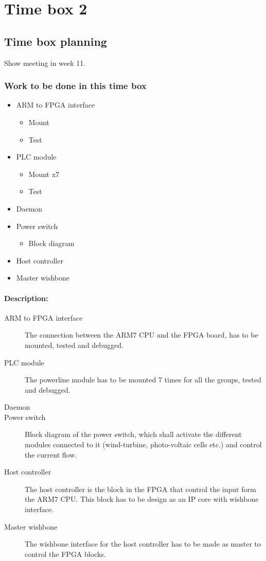 \section{Time box 2}
\subsection{Time box planning}
Show meeting in week 11.
\subsubsection{Work to be done in this time box}
\begin{itemize}
	\item ARM to FPGA interface
	\begin{itemize}
		\item Mount
		\item Test
	\end{itemize}
	\item PLC module
	\begin{itemize}
		\item Mount x7
		\item Test
	\end{itemize}
	\item Daemon
	\item Power switch
	\begin{itemize}
		\item Block diagram
	\end{itemize}
	\item Host controller
	\item Master wishbone
\end{itemize}
\paragraph{Description:}
\begin{description}
	\item[ARM to FPGA interface] The connection between the ARM7 CPU and the FPGA board, has to be mounted, tested and debugged.
	\item[PLC module] The powerline module has to be mounted 7 times for all the groups, tested and debugged.
	\item[Daemon] 
	\item[Power switch] Block diagram of the power switch, which shall activate the different modules connected to it (wind-turbine, photo-voltaic cells etc.) and control the current flow.
	\item[Host controller] The host controller is the block in the FPGA that control the input form the ARM7 CPU. This block has to be design as an IP core with wishbone interface.
	\item[Master wishbone] The wishbone interface for the host controller has to be made as master to control the FPGA blocks.
\end{description}

